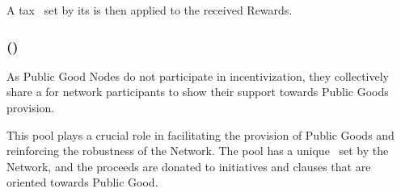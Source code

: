 A tax \tax\ set by its  is then applied to the received Rewards.

\subsubsection{ (\publicGoodPool)}

As Public Good Nodes do not participate in incentivization, they collectively share a  for network participants to show their support towards Public Goods provision.

This pool plays a crucial role in facilitating the provision of Public Goods and reinforcing the robustness of the Network.
The pool has a unique \tax\ set by the Network, and the proceeds are donated to initiatives and clauses that are oriented towards Public Good.
